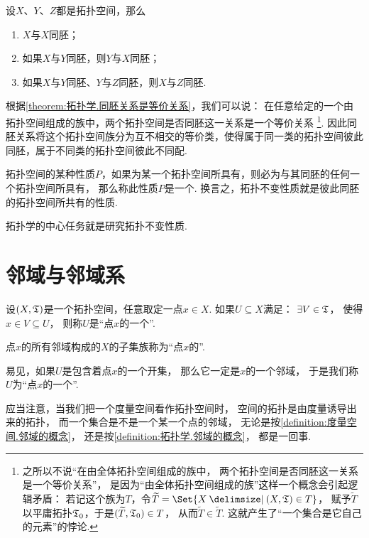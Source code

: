 \begin{theorem}\label{theorem:拓扑学.同胚关系是等价关系}
设\(X\)、\(Y\)、\(Z\)都是拓扑空间，那么
\begin{enumerate}
\item \(X\)与\(X\)同胚；
\item 如果\(X\)与\(Y\)同胚，则\(Y\)与\(X\)同胚；
\item 如果\(X\)与\(Y\)同胚、\(Y\)与\(Z\)同胚，则\(X\)与\(Z\)同胚.
\end{enumerate}
\end{theorem}
根据\cref{theorem:拓扑学.同胚关系是等价关系}，我们可以说：
在任意给定的一个由拓扑空间组成的族中，两个拓扑空间是否同胚这一关系是一个等价关系
\footnote{%
之所以不说“在由全体拓扑空间组成的族中，
两个拓扑空间是否同胚这一关系是一个等价关系”，
是因为“由全体拓扑空间组成的族”这样一个概念会引起逻辑矛盾：
若记这个族为\(T\)，令\(\widetilde{T} = \Set{ X \given (X,\T) \in T }\)，
赋予\(\widetilde{T}\)以平庸拓扑\(\mathfrak T_0\)，于是\((\widetilde{T},\mathfrak T_0) \in T\)，
从而\(\widetilde{T} \in \widetilde{T}\).
这就产生了“一个集合是它自己的元素”的悖论.
}.
因此同胚关系将这个拓扑空间族分为互不相交的等价类，使得属于同一类的拓扑空间彼此同胚，属于不同类的拓扑空间彼此不同配.

拓扑空间的某种性质\(P\)，如果为某一个拓扑空间所具有，则必为与其同胚的任何一个拓扑空间所具有，
那么称此性质\(P\)是一个.
换言之，拓扑不变性质就是彼此同胚的拓扑空间所共有的性质.

{\color{red} 拓扑学的中心任务就是研究拓扑不变性质.}

\section{邻域与邻域系}
\begin{definition}\label{definition:拓扑学.邻域的概念}
设\((X,\mathfrak T)\)是一个拓扑空间，任意取定一点\(x \in X\).
如果\(U \subseteq X\)满足：
\(\exists V \in \mathfrak T\)，
使得\(x \in V \subseteq U\)，
则称\(U\)是“点\(x\)的一个”.

点\(x\)的所有邻域构成的\(X\)的子集族称为“点\(x\)的”.
\end{definition}

易见，如果\(U\)是包含着点\(x\)的一个开集，
那么它一定是\(x\)的一个邻域，
于是我们称\(U\)为“点\(x\)的一个”.

应当注意，当我们把一个度量空间看作拓扑空间时，
空间的拓扑是由度量诱导出来的拓扑，
而一个集合是不是一个某一个点的邻域，
无论是按\cref{definition:度量空间.邻域的概念}，
还是按\cref{definition:拓扑学.邻域的概念}，
都是一回事.

